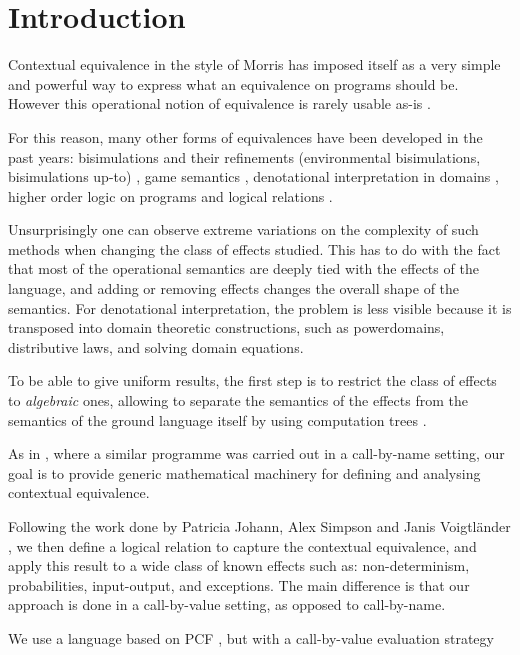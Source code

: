 \section{Introduction}

Contextual equivalence in the style of Morris
has imposed itself as a very simple and powerful
way to express what an equivalence on programs should be. 
However
this operational notion of equivalence is rarely usable 
as-is \cite{pitts1997operationally}.

For this reason, many other forms of equivalences have 
been developed in the past years: bisimulations 
and their refinements (environmental bisimulations, 
bisimulations up-to) \cite{koutavas2011applicative}, 
game semantics \cite{abramsky1999game}, 
denotational interpretation in domains \cite{scott1982domains}, 
higher order logic on 
programs \cite{honda2005observationally} 
and logical relations \cite{Pitts2000}.

Unsurprisingly one can observe extreme variations on 
the complexity of such methods when changing  
the class of effects studied. This has to do with 
the fact that most of the operational semantics 
are deeply tied with the effects of the language, 
and adding or removing effects changes the overall 
shape of the semantics. For denotational interpretation,
the problem is less visible because it is transposed 
into domain theoretic constructions, such as powerdomains, distributive laws,
and solving domain equations.

To be able to give uniform results, the first 
step is to restrict the class of effects
to \emph{algebraic} ones, 
allowing to separate the semantics 
of the effects from the semantics of the ground language
itself by using computation trees \cite{plotkin2001adequacy}.


As in  \cite{gom}, where a similar programme was carried out in a call-by-name setting,
our goal is to provide generic mathematical machinery for defining and 
analysing contextual equivalence. 

Following the work done by Patricia
Johann, Alex Simpson and Janis Voigtländer \cite{gom}, we then define 
a logical relation to capture the contextual 
equivalence, and apply this result to a wide class of known effects 
such as: non-determinism, probabilities, input-output, and exceptions. 
The main difference is that our approach 
is done in a call-by-value setting, as opposed 
to call-by-name.

We use a language based on PCF \cite{plotkin1977lcf}, but with  a call-by-value 
evaluation strategy

